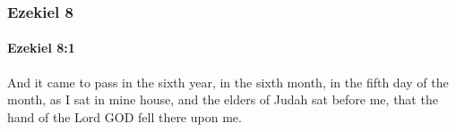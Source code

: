 	\subsubsection{Ezekiel 8} %
		\label{EZEKIEL-8}

		\paragraph{Ezekiel 8:1} %
			\label{EZEKIEL-8-1}

			And it came to pass in the sixth year, in the sixth month, in the fifth day of the month, as I sat in mine house, and the elders of Judah sat before me, that the hand of the Lord GOD fell there upon me.


